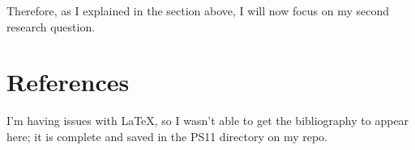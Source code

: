 \documentclass{article}
\begin{document}
	Therefore, as I explained in the section above, I will now focus on my second research question.
	
	\section{References}
	
	I'm having issues with LaTeX, so I wasn't able to get the bibliography to appear here; it is complete and saved in the PS11 directory on my repo.
	
	
\end{document}
